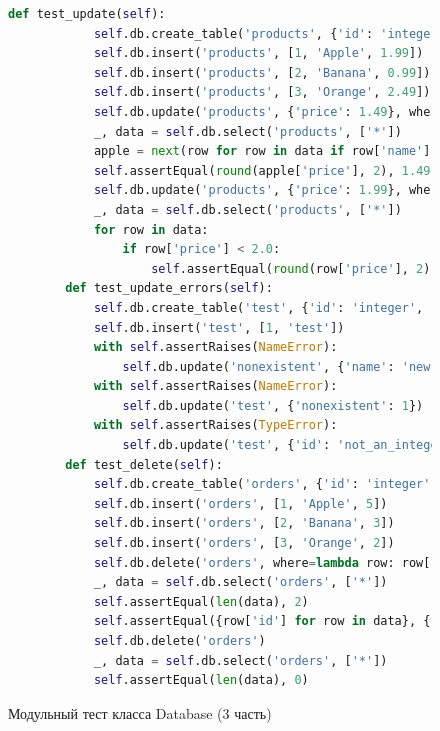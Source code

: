 \begin{figure}[H]
\begin{lstlisting}[language=Python, breaklines=true, firstnumber=76]				
		def test_update(self):
			self.db.create_table('products', {'id': 'integer', 'name': 'string', 'price': 'float'})
			self.db.insert('products', [1, 'Apple', 1.99])
			self.db.insert('products', [2, 'Banana', 0.99])
			self.db.insert('products', [3, 'Orange', 2.49])			
			self.db.update('products', {'price': 1.49}, where=lambda row: row['name'] == 'Apple')			
			_, data = self.db.select('products', ['*'])
			apple = next(row for row in data if row['name'] == 'Apple')
			self.assertEqual(round(apple['price'], 2), 1.49)			
			self.db.update('products', {'price': 1.99}, where=lambda row: row['price'] < 2.0)			
			_, data = self.db.select('products', ['*'])
			for row in data:
				if row['price'] < 2.0:
					self.assertEqual(round(row['price'], 2), 1.99)					
		def test_update_errors(self):
			self.db.create_table('test', {'id': 'integer', 'name': 'string'})
			self.db.insert('test', [1, 'test'])			
			with self.assertRaises(NameError):
				self.db.update('nonexistent', {'name': 'new'})			
			with self.assertRaises(NameError):
				self.db.update('test', {'nonexistent': 1})			
			with self.assertRaises(TypeError):
				self.db.update('test', {'id': 'not_an_integer'})				
		def test_delete(self):
			self.db.create_table('orders', {'id': 'integer', 'product': 'string', 'quantity': 'integer'})
			self.db.insert('orders', [1, 'Apple', 5])
			self.db.insert('orders', [2, 'Banana', 3])
			self.db.insert('orders', [3, 'Orange', 2])			
			self.db.delete('orders', where=lambda row: row['id'] == 2)			
			_, data = self.db.select('orders', ['*'])
			self.assertEqual(len(data), 2)
			self.assertEqual({row['id'] for row in data}, {1, 3})			
			self.db.delete('orders')			
			_, data = self.db.select('orders', ['*'])
			self.assertEqual(len(data), 0)
\end{lstlisting}  
\caption{Модульный тест класса Database (3 часть)}
\label{fig:test_db_3}
\end{figure}	
